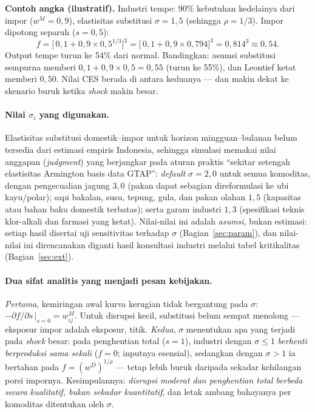 \documentclass[11pt,a4paper]{article}
\newcommand{\en}[1]{\textit{#1}}   %
\begin{document}
\begin{intuisi}
\textbf{Contoh angka (ilustratif).} Industri tempe: 90\% kebutuhan
kedelainya dari impor ($w^M = 0{,}9$), elastisitas substitusi
$\sigma = 1{,}5$ (sehingga $\rho = 1/3$). Impor dipotong separuh
($s = 0{,}5$):
\[
f = \bigl[\,0{,}1 + 0{,}9 \times 0{,}5^{1/3}\bigr]^{3}
  = \bigl[\,0{,}1 + 0{,}9 \times 0{,}794\bigr]^{3}
  = 0{,}814^{3} \approx 0{,}54 .
\]
Output tempe turun ke 54\% dari normal. Bandingkan: asumsi substitusi
sempurna memberi $0{,}1 + 0{,}9 \times 0{,}5 = 0{,}55$ (turun ke 55\%),
dan Leontief ketat memberi $0{,}50$. Nilai CES berada di antara keduanya
--- dan makin dekat ke skenario buruk ketika \en{shock} makin besar.
\end{intuisi}

\paragraph{Nilai $\sigma_i$ yang digunakan.} Elastisitas substitusi
domestik--impor untuk horizon mingguan--bulanan belum tersedia dari
estimasi empiris Indonesia, sehingga simulasi memakai nilai anggapan
(\en{judgment}) yang berjangkar pada aturan praktis ``sekitar setengah
elastisitas Armington basis data GTAP'': \emph{default} $\sigma = 2{,}0$
untuk semua komoditas, dengan pengecualian jagung $3{,}0$ (pakan dapat
sebagian direformulasi ke ubi kayu/polar); sapi bakalan, susu, tepung,
gula, dan pakan olahan $1{,}5$ (kapasitas atau bahan baku domestik
terbatas); serta garam industri $1{,}3$ (spesifikasi teknis klor-alkali
dan farmasi yang ketat). Nilai-nilai ini adalah \emph{asumsi}, bukan
estimasi: setiap hasil disertai uji sensitivitas terhadap $\sigma$
(Bagian~\ref{sec:param}), dan nilai-nilai ini direncanakan diganti hasil
konsultasi industri melalui tabel kritikalitas (Bagian~\ref{sec:ext}).

\paragraph{Dua sifat analitis yang menjadi pesan kebijakan.}
\emph{Pertama}, kemiringan awal kurva kerugian tidak bergantung pada
$\sigma$: $-\partial f/\partial s\,|_{s=0} = w^{M}_{ij}$. Untuk disrupsi
kecil, substitusi belum sempat menolong --- eksposur impor adalah
eksposur, titik. \emph{Kedua}, $\sigma$ menentukan apa yang terjadi pada
\en{shock} besar: pada penghentian total ($s = 1$), industri dengan
$\sigma \le 1$ \emph{berhenti berproduksi sama sekali} ($f = 0$; inputnya
esensial), sedangkan dengan $\sigma > 1$ ia bertahan pada
$f = (w^D)^{1/\rho}$ --- tetap lebih buruk daripada sekadar kehilangan
porsi impornya. Kesimpulannya: \emph{disrupsi moderat dan penghentian
total berbeda secara kualitatif, bukan sekadar kuantitatif}, dan letak
ambang bahayanya per komoditas ditentukan oleh $\sigma$.
\end{document}
